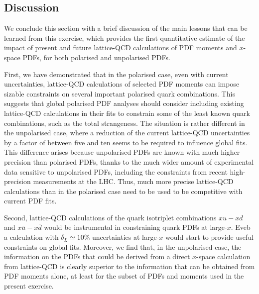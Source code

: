 \subsection{Discussion}

We conclude this section with a brief discussion of the main lessons that
can be learned from this exercise, which provides the first quantitative estimate
of the impact of present and future lattice-QCD calculations of PDF moments
and $x$-space PDFs, for both polarised and unpolarised PDFs.

First, we have demonstrated that in the polarised case,
even with current uncertainties, lattice-QCD calculations of
selected PDF moments can impose sizable constraints on several
important polarised quark combinations.
%
This suggests that global polarised PDF analyses should consider
including existing lattice-QCD calculations in their fits to constrain some
of the least known quark combinations, such as the total strangeness.
%
The situation is rather different in the unpolarised case,
where a reduction of the current lattice-QCD uncertainties by a factor of between five 
and ten seems to be required to influence global fits.
%
This difference arises because unpolarised PDFs are known with much higher precision than polarised
PDFs, thanks to the much wider amount of experimental data sensitive to unpolarised PDFs,
including the constraints from recent high-precision measurements at the
LHC.
%
Thus, much more precise lattice-QCD calculations than in the polarised case
need to be used to be competitive with current PDF fits.

Second, lattice-QCD calculations of the quark isotriplet combinations
$xu-xd$ and $x\bar{u}-x\bar{d}$ would be instrumental in constraining
quark PDFs at large-$x$.
%
Eveb a calculation with $\delta_L\simeq 10\%$ uncertainties at large-$x$ would
start to provide useful constraints on global fits.
%
Moreover, we find that, in the unpolarised case, the information on the
PDFs that could be derived from a direct $x$-space calculation
from lattice-QCD is clearly superior to the information that can be obtained
from PDF moments alone, at least for the subset of PDFs and moments used in the present
exercise.

